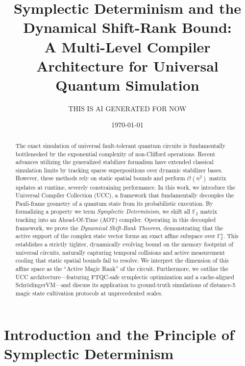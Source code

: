 \documentclass[aps,prx,reprint,superscriptaddress,nofootinbib]{revtex4-2}
\theoremstyle{definition}
\newcommand{\svm}{Schr\"odingerVM}
\begin{document}
\title{Symplectic Determinism and the Dynamical Shift-Rank Bound:\\ A Multi-Level Compiler Architecture for Universal Quantum Simulation}

\author{THIS IS AI GENERATED FOR NOW}

\date{\today}

\begin{abstract}
The exact simulation of universal fault-tolerant quantum circuits is fundamentally bottlenecked by the exponential complexity of non-Clifford operations. Recent advances utilizing the generalized stabilizer formalism have extended classical simulation limits by tracking sparse superpositions over dynamic stabilizer bases. However, these methods rely on static spatial bounds and perform $\mathcal{O}(n^2)$ matrix updates at runtime, severely constraining performance. In this work, we introduce the Universal Compiler Collection (UCC), a framework that fundamentally decouples the Pauli-frame geometry of a quantum state from its probabilistic execution. By formalizing a property we term \textit{Symplectic Determinism}, we shift all $\mathbb{F}_2$ matrix tracking into an Ahead-Of-Time (AOT) compiler. Operating in this decoupled framework, we prove the \textit{Dynamical Shift-Rank Theorem}, demonstrating that the active support of the complex state vector forms an exact affine subspace over $\mathbb{F}_2^n$. This establishes a strictly tighter, dynamically evolving bound on the memory footprint of universal circuits, naturally capturing temporal collisions and active measurement cooling that static spatial bounds fail to resolve. We interpret the dimension of this affine space as the ``Active Magic Rank'' of the circuit. Furthermore, we outline the UCC architecture—featuring FTQC-safe symplectic optimization and a cache-aligned \svm{}—and discuss its application to ground-truth simulations of distance-5 magic state cultivation protocols at unprecedented scales.
\end{abstract}

\maketitle

\section{Introduction and the Principle of Symplectic Determinism}
\label{sec:intro}
\end{document}

